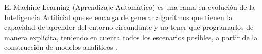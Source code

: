 El Machine Learning (Aprendizaje Automático) es una rama en evolución de la Inteligencia Artificial que se encarga de generar algoritmos que tienen la capacidad de aprender del entorno circundante y no tener que programarlos de manera explícita, teniendo en cuenta todos los escenarios posibles, a partir de la construcción de modelos analíticos \cite{Sandoval18}. %



 
 
 
